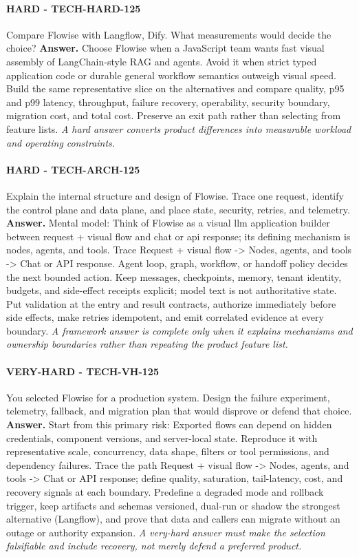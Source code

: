 \paragraph{HARD - TECH-HARD-125} Compare Flowise with Langflow, Dify. What measurements would decide the choice?
\textbf{Answer.} Choose Flowise when a JavaScript team wants fast visual assembly of LangChain-style RAG and agents. Avoid it when strict typed application code or durable general workflow semantics outweigh visual speed. Build the same representative slice on the alternatives and compare quality, p95 and p99 latency, throughput, failure recovery, operability, security boundary, migration cost, and total cost. Preserve an exit path rather than selecting from feature lists.
\textit{A hard answer converts product differences into measurable workload and operating constraints.}
\paragraph{HARD - TECH-ARCH-125} Explain the internal structure and design of Flowise. Trace one request, identify the control plane and data plane, and place state, security, retries, and telemetry.
\textbf{Answer.} Mental model: Think of Flowise as a visual llm application builder between request + visual flow and chat or api response; its defining mechanism is nodes, agents, and tools. Trace Request + visual flow -> Nodes, agents, and tools -> Chat or API response. Agent loop, graph, workflow, or handoff policy decides the next bounded action. Keep messages, checkpoints, memory, tenant identity, budgets, and side-effect receipts explicit; model text is not authoritative state. Put validation at the entry and result contracts, authorize immediately before side effects, make retries idempotent, and emit correlated evidence at every boundary.
\textit{A framework answer is complete only when it explains mechanisms and ownership boundaries rather than repeating the product feature list.}
\paragraph{VERY-HARD - TECH-VH-125} You selected Flowise for a production system. Design the failure experiment, telemetry, fallback, and migration plan that would disprove or defend that choice.
\textbf{Answer.} Start from this primary risk: Exported flows can depend on hidden credentials, component versions, and server-local state. Reproduce it with representative scale, concurrency, data shape, filters or tool permissions, and dependency failures. Trace the path Request + visual flow -> Nodes, agents, and tools -> Chat or API response; define quality, saturation, tail-latency, cost, and recovery signals at each boundary. Predefine a degraded mode and rollback trigger, keep artifacts and schemas versioned, dual-run or shadow the strongest alternative (Langflow), and prove that data and callers can migrate without an outage or authority expansion.
\textit{A very-hard answer must make the selection falsifiable and include recovery, not merely defend a preferred product.}
